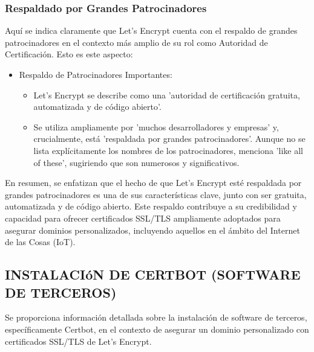 \documentclass{report}
\begin{document}
\subsubsection{Respaldado por Grandes Patrocinadores}
Aquí se indica claramente que Let's Encrypt cuenta con el respaldo de grandes patrocinadores en el contexto 
más amplio de su rol como Autoridad de Certificación.
Esto es este aspecto:
\begin{itemize}
    \item Respaldo de Patrocinadores Importantes:
        \begin{itemize}
            \item Let's Encrypt se describe como una 'autoridad de certificación gratuita, automatizada y de código abierto'.
            \item Se utiliza ampliamente por 'muchos desarrolladores y empresas' y, crucialmente, está 'respaldada por grandes 
            patrocinadores'. Aunque no se  lista explícitamente los nombres de los patrocinadores, menciona 'like all of these', 
            sugiriendo que son numerosos y significativos.
        \end{itemize}
\end{itemize}
En resumen, se  enfatizan que el hecho de que Let's Encrypt esté respaldada por grandes patrocinadores es una de 
sus características clave, junto con ser gratuita, automatizada y de código abierto. Este respaldo contribuye a su 
credibilidad y capacidad para ofrecer certificados SSL/TLS ampliamente adoptados para asegurar dominios personalizados, 
incluyendo aquellos en el ámbito del Internet de las Cosas (IoT).

\subsection{INSTALACIóN DE CERTBOT (SOFTWARE DE TERCEROS)}
Se proporciona información detallada sobre la instalación de software de terceros, específicamente Certbot, en el contexto 
de asegurar un dominio personalizado con certificados SSL/TLS de Let's Encrypt.
\end{document}
